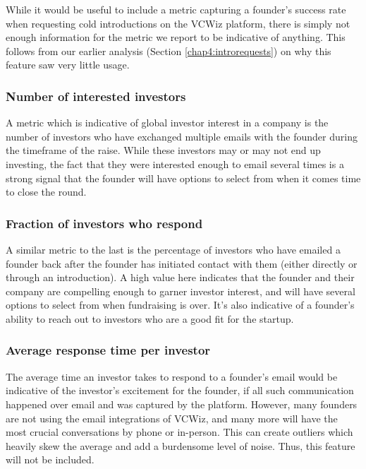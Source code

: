 While it would be useful to include a metric capturing a founder's success rate when requesting cold introductions on the VCWiz platform, there is simply not enough information for the metric we report to be indicative of anything. This follows from our earlier analysis (Section \ref{chap4:introrequests}) on why this feature saw very little usage.

\subsubsection{Number of interested investors}

A metric which is indicative of global investor interest in a company is the number of investors who have exchanged multiple emails with the founder during the timeframe of the raise. While these investors may or may not end up investing, the fact that they were interested enough to email several times is a strong signal that the founder will have options to select from when it comes time to close the round.

\subsubsection{Fraction of investors who respond}

A similar metric to the last is the percentage of investors who have emailed a founder back after the founder has initiated contact with them (either directly or through an introduction). A high value here indicates that the founder and their company are compelling enough to garner investor interest, and will have several options to select from when fundraising is over. It's also indicative of a founder's ability to reach out to investors who are a good fit for the startup.

\subsubsection{Average response time per investor}

The average time an investor takes to respond to a founder's email would be indicative of the investor's excitement for the founder, if all such communication happened over email and was captured by the platform. However, many founders are not using the email integrations of VCWiz, and many more will have the most crucial conversations by phone or in-person. This can create outliers which heavily skew the average and add a burdensome level of noise. Thus, this feature will not be included.

